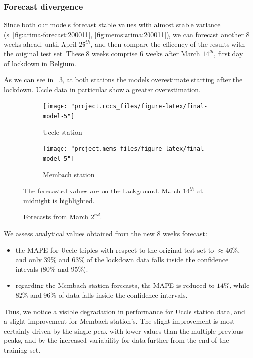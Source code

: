 \documentclass[12pt]{article}
\begin{document}
\subsubsection{Forecast divergence}
Since both our models forecast stable values with almost stable variance (\figurename{s}~\ref{fig:arima-forecast:200011}, \ref{fig:mems:arima:200011}), we can forecast another 8 weeks ahead, until April $26^{th}$, and then compare the efficency of the results with the original test set. These 8 weeks comprise 6 weeks after March $14^{th}$, first day of lockdown in Belgium.

As we can see in \figurename~\ref{fig:forecast.lockdown}, at both stations the models overestimate starting after the lockdown. Uccle data in particular show a greater overestimation.

\begin{figure}[h]
	\begin{subfigure}{.5\linewidth}
		\texttt{[image: "project.uccs\_files/figure-latex/final-model-5"]}
		\caption{Uccle station}
		\label{fig:forecast.lockdown:uccs}
	\end{subfigure}
	\begin{subfigure}{.5\linewidth}
		\texttt{[image: "project.mems\_files/figure-latex/final-model-5"]}
		\caption{Membach station}
		\label{fig:forecast.lockdown:mems}
	\end{subfigure}
	\caption{Forecasts from March $2^{nd}$.}{\centering\small The forecasted values are on the background. March $14^{th}$ at midnight is highlighted.\\}
	\label{fig:forecast.lockdown}
\end{figure}
%
We assess analytical values obtained from the new 8 weeks forecast:
\begin{itemize}[topsep=0.5em,itemsep=0em,partopsep=0.5em]
	\item the MAPE for Uccle triples with respect to the original test set to $\approx46\%$, and only 39\% and 63\% of the lockdown data falls inside the confidence intevals (80\% and 95\%).
	\item regarding the Membach station forecasts, the MAPE is reduced to $14\%$, while 82\% and 96\% of data falls inside the confidence intervals.
\end{itemize}

Thus, we notice a visible degradation in performance for Uccle station data, and a slight improvement for Membach station's. The slight improvement is most certainly driven by the single peak with lower values than the multiple previous peaks, and by the increased variability for data further from the end of the training set.
\end{document}
